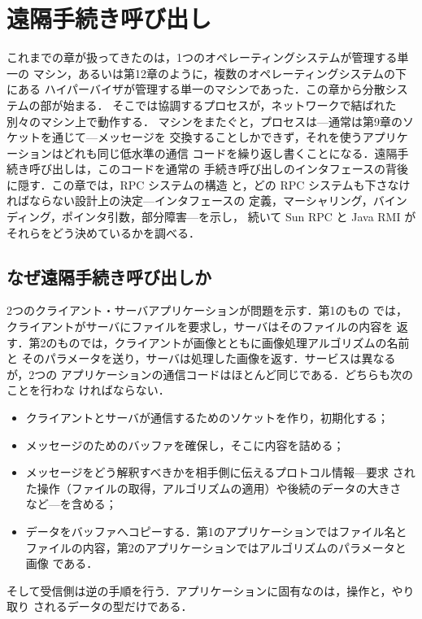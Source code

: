 \documentclass[../main.tex]{subfiles}
\begin{document}
\chapter{遠隔手続き呼び出し}

これまでの章が扱ってきたのは，1つのオペレーティングシステムが管理する単一の
マシン，あるいは第12章のように，複数のオペレーティングシステムの下にある
ハイパーバイザが管理する単一のマシンであった．この章から分散システムの部が始まる．
そこでは協調するプロセスが，ネットワークで結ばれた別々のマシン上で動作する．%
マシンをまたぐと，プロセスは---通常は第9章のソケットを通じて---メッセージを
交換することしかできず，それを使うアプリケーションはどれも同じ低水準の通信
コードを繰り返し書くことになる．遠隔手続き呼び出しは，このコードを通常の
手続き呼び出しのインタフェースの背後に隠す．この章では，RPC システムの構造
と，どの RPC システムも下さなければならない設計上の決定---インタフェースの
定義，マーシャリング，バインディング，ポインタ引数，部分障害---を示し，
続いて Sun RPC と Java RMI がそれらをどう決めているかを調べる．

\section{なぜ遠隔手続き呼び出しか}
\label{sec:l13-why}

2つのクライアント・サーバアプリケーションが問題を示す．第1のもの
では，クライアントがサーバにファイルを要求し，サーバはそのファイルの内容を
返す．第2のものでは，クライアントが画像とともに画像処理アルゴリズムの名前と
そのパラメータを送り，サーバは処理した画像を返す．サービスは異なるが，2つの
アプリケーションの通信コードはほとんど同じである．どちらも次のことを行わな
ければならない．
\begin{itemize}
  \item クライアントとサーバが通信するためのソケットを作り，初期化する；
  \item メッセージのためのバッファを確保し，そこに内容を詰める；
  \item メッセージをどう解釈すべきかを相手側に伝えるプロトコル情報---要求
    された操作（ファイルの取得，アルゴリズムの適用）や後続のデータの大きさ
    など---を含める；
  \item データをバッファへコピーする．第1のアプリケーションではファイル名と
    ファイルの内容，第2のアプリケーションではアルゴリズムのパラメータと画像
    である．
\end{itemize}
そして受信側は逆の手順を行う．アプリケーションに固有なのは，操作と，やり取り
されるデータの型だけである．
\end{document}
